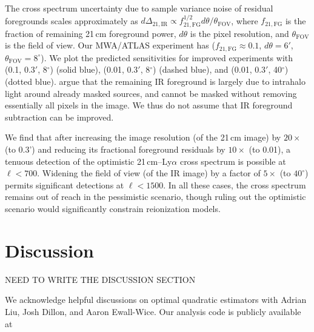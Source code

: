 \documentclass{emulateapj}
\newcommand{\IR}{\text{IR}}
\begin{document}
The cross spectrum uncertainty due to sample variance noise of residual foregrounds scales approximately as $d\Delta_{21,\IR}\propto f_{21,\text{FG}}^{1/2}d\theta/\theta_{\text{FOV}}$, where $f_{21,\text{FG}}$ is the fraction of remaining 21\,cm foreground power, $d\theta$ is the pixel resolution, and $\theta_{\text{FOV}}$ is the field of view. Our MWA/ATLAS experiment has ($f_{21,\text{FG}}\approx0.1$, $d\theta=6'$, $\theta_{\text{FOV}}=8^\circ$). We plot the predicted sensitivities for improved experiments with (0.1, $0.3'$, 8$^\circ$) (solid blue), (0.01, $0.3'$, 8$^\circ$) (dashed blue), and (0.01, $0.3'$, 40$^\circ$) (dotted blue). \citet{zemcov14,cooray12} argue that the remaining IR foreground is largely due to intrahalo light around already masked sources, and cannot be masked without removing essentially all pixels in the image. We thus do not assume that IR foreground subtraction can be improved.

We find that after increasing the image resolution (of the 21\,cm image) by $20\times$ (to 0.3') and reducing its fractional foreground residuals by $10\times$ (to 0.01), a tenuous detection of the optimistic 21\,cm--Ly$\alpha$ cross spectrum is possible at $\ell<700$. Widening the field of view (of the IR image) by a factor of $5\times$ (to $40^\circ$) permits significant detections at $\ell<1500$. In all these cases, the cross spectrum remains out of reach in the pessimistic scenario, though ruling out the optimistic scenario would significantly constrain reionization models.

\section{Discussion}

NEED TO WRITE THE DISCUSSION SECTION

\begin{acknowledgments}
We acknowledge helpful discussions on optimal quadratic estimators with Adrian Liu, Josh Dillon, and Aaron Ewall-Wice. 
Our analysis code is publicly available at 
\end{acknowledgments}

\appendix

\end{document}
